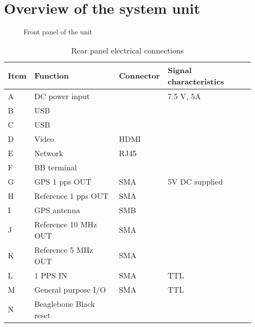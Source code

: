 
\section{Overview of the system unit}


\begin{figure}[h]
\caption{Front panel of the unit}
\end{figure}

\begin{table}
	\begin{tabular}{llll}
	Item & Function & Connector & Signal characteristics \\ \hline
	A & DC power input & & 7.5 V, 5A \\
	B & USB & & \\
	C & USB & & \\
	D & Video & HDMI & \\
	E & Network & RJ45 & \\
	F & BB terminal & & \\
	G & GPS 1 pps OUT & SMA & 5V DC supplied\\
	H & Reference 1 pps OUT & SMA & \\
	I & GPS antenna & SMB & \\
	J & Reference 10 MHz OUT& SMA & \\
	K & Reference 5 MHz OUT & SMA & \\
	L & 1 PPS IN & SMA & TTL\\
	M & General purpose I/O & SMA & TTL \\
	N & Beaglebone Black reset & &
	\end{tabular}
	\caption{Rear panel electrical connections}
\end{table}